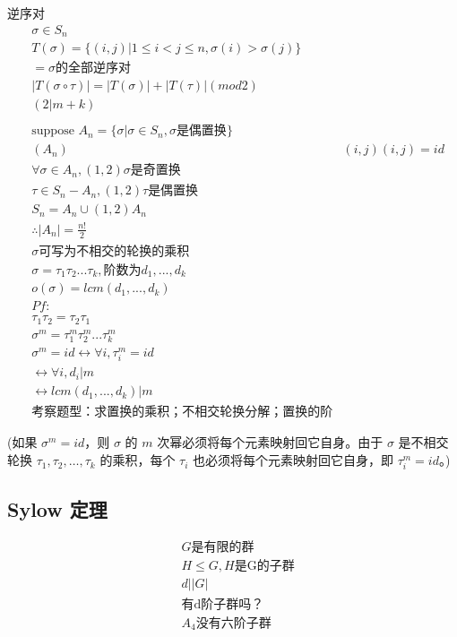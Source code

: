 \documentclass[12pt, a4paper]{article}  %
\begin{document}
逆序对
\begin{align}
    &\sigma \in S_n\\
    &T(\sigma)=\{(i,j)|1\leqslant i<j\leqslant n,\sigma(i)>\sigma(j)\}\\
    &=\sigma\text{的全部逆序对}\\
    &|T(\sigma\circ \tau)|=|T(\sigma)|+|T(\tau)|(mod 2)\\
    &(2|m+k)\\
    &\\
    &\text{suppose } A_n=\{\sigma|\sigma \in S_n,\sigma\text{是偶置换}\}\\
    &(A_n)
    &(i,j)(i,j)=id\\
    &\forall \sigma\in A_n,(1,2)\sigma\text{是奇置换}\\
    &\tau\in S_n-A_n,(1,2)\tau\text{是偶置换}\\
    &S_n=A_n\cup (1,2)A_n\\
    &\therefore|A_n|=\frac{n!}{2}\\
    &\sigma\text{可写为不相交的轮换的乘积}\\
    &\sigma=\tau_1\tau_2...\tau_{k},\text{阶数为}d_1,...,d_k\\
    &o(\sigma)=lcm(d_1,...,d_k)\\
    &Pf:\\
    &\tau_1\tau_2=\tau_2\tau_1\\
    &\sigma ^m=\tau_1^m\tau_2^m...\tau_k^m\\
    &\sigma^m=id\leftrightarrow \forall i,\tau_i^m=id\\
    &\leftrightarrow \forall i, d_i|m\\
    &\leftrightarrow lcm(d_1,...,d_k)|m\\
    &\text{考察题型：求置换的乘积；不相交轮换分解；置换的阶}
\end{align}

(如果 \(\sigma^m = id\)，则 \(\sigma\) 的 \(m\) 次幂必须将每个元素映射回它自身。由于 \(\sigma\) 是不相交轮换 \(\tau_1, \tau_2, \ldots, \tau_k\) 的乘积，每个 \(\tau_i\) 也必须将每个元素映射回它自身，即 \(\tau_i^m = id\)。)

\subsection{Sylow 定理}
\begin{align}
    &G\text{是有限的群}\\
    &H\leqslant G,H\text{是G的子群}\\
    &d||G|\\
    &\text{有d阶子群吗？}\\
    &A_4\text{没有六阶子群}  
\end{align}
\end{document}
